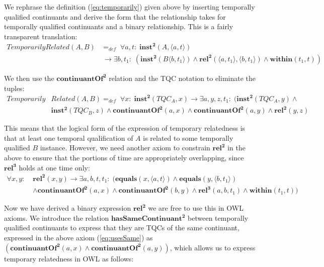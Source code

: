 \documentclass[10pt]{bmc_article}
\newcommand{\mirel}[1]{\ensuremath{\mathrm{\mathbf{#1}}}}
\newcommand{\mclass}[1]{\ensuremath{\mathit{#1}}}
\newcommand{\mrel}[2]{\mirel{#1^#2}}
\newcommand{\mrelb}[1]{\mrel{#1}{2}}
\newcommand{\mrelt}[1]{\mrel{#1}{3}}
\newcommand{\pair}[2]{\ensuremath{\langle #1,#2\rangle}}
\newcommand{\TQC}[1]{\ensuremath{TQC_{\mclass{#1}}}}
\newenvironment{bmcformat}{\baselineskip20pt\sloppy\setboolean{publ}{false}}{\baselineskip20pt\sloppy}
\begin{document}
\begin{bmcformat}
We rephrase the definition (\ref{eq:temporarily}) given above by inserting
temporally qualified continuants and derive the form that the relationship takes
for temporally qualified continuants and a binary relationship. This is a fairly
transparent translation:
\begin{equation}
\begin{split}
\mclass{TemporarilyRelated}(\mclass{A},\mclass{B})& =_{def}\;
\forall a, t:\; \mrelb{inst}(\mclass{A}, \pair{a}{t}) \\
&\ \rightarrow
\exists b, t_1:\;(\mrelb{inst}(\mclass{B}\pair{b}{t_1}) \wedge
\mrelb{rel}(\pair{a}{t_1},\pair{b}{t_1}) \wedge \mirel{within}(t_1,t))
\end{split}
\end{equation}

We then use the \mrelb{continuantOf} relation and the TQC notation to eliminate
the tuples:
\begin{equation}
\begin{split}
\mclass{Temporarily}&\mclass{Related}(\mclass{A},\mclass{B}) =_{def}\;
\forall x:\; \mrelb{inst}(\TQC{A}, x)
 \rightarrow
\exists a,y,z,t_1:\;(\mrelb{inst}(\TQC{A},y) \wedge \\ & \mrelb{inst}(\TQC{B},z) 
 \wedge \mrelb{continuantOf}(a,x) \wedge \mrelb{continuantOf}(a,y) \wedge
\mrelb{rel}(y,z) 
\end{split}
\label{eq:usesSame}
\end{equation}

This means that the logical form of the expression of temporary relatedness is that
at least one temporal qualification of \mclass{A} is related to some temporally
qualified \mclass{B} instance.
However, we need another axiom to constrain \mrelb{rel} in the above to ensure that the
portions of time are appropriately overlapping, since \mrelt{rel} holds at one time
only:
\begin{equation}
\begin{split}
\forall x,y:\;& \mrelb{rel}(x,y) \rightarrow \exists a,b,t,t_1:\;
(\mirel{equals}(x,\pair{a}{t})\wedge \mirel{equals}(y,\pair{b}{t_1})\\ 
& \wedge \mrelb{continuantOf}(a,x) \wedge \mrelb{continuantOf}(b,y) \wedge
\mrelt{rel}(a,b,t_1) \wedge \mirel{within}(t_1,t))
\end{split}
\end{equation}

Now we have derived a binary expression \mrelb{rel} we are free to use this in OWL
axioms. We introduce the relation \mrelb{hasSameContinuant} between temporally qualified
continuants to express that they are TQCs of the same continuant,
expressed in the above axiom (\ref{eq:usesSame}) as $(\mrelb{continuantOf}(a,x)
\wedge \mrelb{continuantOf}(a,y))$, which allows us to express temporary relatedness in OWL as follows:


\end{bmcformat}
\end{document}

